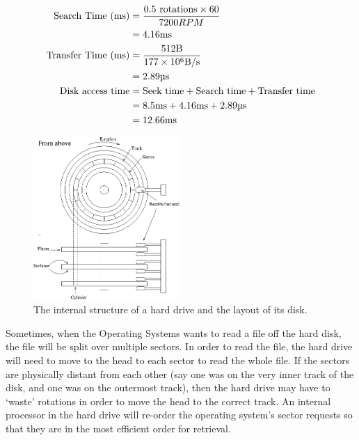 
\[
  \begin{split}
    \text{Search Time (\si{\milli\second})} &= \frac{0.5\text{ rotations} \times 60}{7200RPM}\\
                                            &= 4.16\si{\milli\second}\\
    \text{Transfer Time (\si{\milli\second})} &= \frac{512\si{\byte}}{177\times10^6\si{\byte\per\second}}\\
                                              &= 2.89\si{\micro\second}\\
    \text{Disk access time} &= \text{Seek time} + \text{Search time}
                                + \text{Transfer time}\\
                            &= 8.5\si{\milli\second} + 4.16\si{\milli\second} + 2.89\si{\micro\second}\\
                            &= 12.66\si{\milli\second}
  \end{split}
\]

\begin{figure}[h]
  \centering
  \includegraphics[width=0.5\textwidth]{images/hd-schematic}
  \caption{The internal structure of a hard drive and the layout of its disk.}
  \label{hd-config}
\end{figure}


Sometimes, when the Operating Systems wants to read a file off the hard disk,
the file will be split over multiple sectors. In order to read the file, the
hard drive will need to move to the head to each sector to read the whole file.
If the sectors are physically distant from each other (say one was on the very
inner track of the disk, and one was on the outermost track), then the hard
drive may have to `waste' rotations in order to move the head to the correct
track. An internal processor in the hard drive will re-order the operating
system's sector requests so that they are in the most efficient order for
retrieval.

